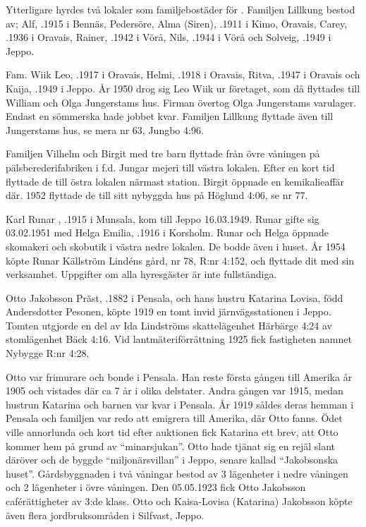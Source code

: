 Ytterligare hyrdes två lokaler som familjebostäder för . Familjen Lillkung bestod av; Alf, .1915 i Bennäs, Pedersöre,	Alma (Siren), .1911 i Kimo, Oravais,	Carey, .1936 i Oravais, Rainer,	.1942 i Vörå, Nils,	.1944 i Vörå	och	Solveig,	.1949 i Jeppo.

Fam. Wiik	Leo, .1917 i Oravais, Helmi,	.1918 i Oravais,	Ritva, .1947 i Oravais och Kaija, .1949 i Jeppo. År 1950 drog sig Leo Wiik ur företaget, som då flyttades till William och Olga Jungerstams hus. Firman övertog Olga Jungerstams varulager. Endast en sömmerska hade jobbet kvar. Familjen Lillkung flyttade även till Jungerstams hus, se mera nr 63, Jungbo 4:96.

Familjen Vilhelm och Birgit  med tre barn flyttade från övre våningen på pälsberederifabriken i f.d. Jungar mejeri till västra lokalen. Efter en kort tid flyttade de till östra lokalen närmast station. Birgit öppnade en kemikalieaffär där. 1952 flyttade de till sitt nybyggda hus på Höglund 4:06, se nr 77.

Karl Runar , .1915 i Munsala, kom till Jeppo 16.03.1949. Runar gifte sig 03.02.1951 med Helga Emilia, .1916 i Korsholm. Runar och Helga öppnade skomakeri och skobutik i västra nedre lokalen. De bodde även i huset. År 1954 köpte Runar Källström Lindéns gård, nr 78, R:nr 4:152, och flyttade dit med sin verksamhet.
Uppgifter om alla hyresgäster är inte fullständiga.


%
Otto Jakobsson Präst, .1882 i Pensala, och hans hustru Katarina Lovisa, född Andersdotter Pesonen, köpte 1919 en tomt invid järnvägsstationen i Jeppo. Tomten utgjorde en del av Ida Lindströms skattelägenhet Härbärge 4:24 av stomlägenhet Bäck 4:16. Vid lantmäteriförrättning 1925 fick fastigheten namnet Nybygge R:nr 4:28.

Otto var frimurare och bonde i Pensala. Han reste första gången till Amerika år 1905 och vistades där ca 7 år i olika delstater. Andra gången var 1915, medan hustrun Katarina och barnen var kvar i Pensala. År 1919 såldes deras hemman i Pensala och familjen var redo att emigrera till Amerika, där Otto fanns. Ödet ville annorlunda och kort tid efter auktionen fick Katarina ett brev, att Otto kommer hem på grund av ``minarsjukan''. Otto hade tjänat sig en rejäl slant däröver och de byggde ``miljonärsvillan'' i Jeppo, senare kallad ``Jakobsonska huset''.  Gårdsbyggnaden i två våningar  bestod av 3 lägenheter i nedre våningen och 2 lägenheter i övre våningen. Den 05.05.1923 fick Otto Jakobsson caférättigheter av 3:de klass. Otto och Kaisa-Lovisa (Katarina) Jakobsson köpte även flera jordbruksområden i Silfvast, Jeppo.

